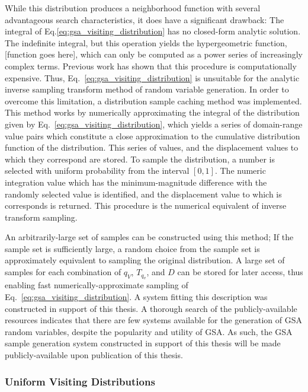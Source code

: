 \documentclass[11pt]{afthesis}
\begin{document}
	While this distribution produces a neighborhood function with several advantageous search characteristics, it does have a significant drawback:  The integral of Eq.\ref{eq:gsa_visiting_distribution} has no closed-form analytic solution. The indefinite integral, but this operation yields the hypergeometric function, [function goes here], which can only be computed as a power series of increasingly complex terms. Previous work \cite{dallinga2004performancegsa} has shown that this procedure is computationally expensive. Thus, Eq.~\ref{eq:gsa_visiting_distribution} is unsuitable for the analytic inverse sampling transform method of random variable generation. In order to overcome this limitation, a distribution sample caching method was implemented. This method works by numerically approximating the integral of the distribution given by Eq.~\ref{eq:gsa_visiting_distribution}, which yields a series of domain-range value pairs which constitute a close approximation to the cumulative distribution function of the distribution. This series of values, and the displacement values to which they correspond are stored. To sample the distribution, a number is selected with uniform probability from the interval $[0,1]$. The numeric integration value which has the minimum-magnitude difference with the randomly selected value is identified, and the displacement value to which is corresponds is returned. This procedure is the numerical equivalent of inverse transform sampling. 
	
	An arbitrarily-large set of samples can be constructed using this method; If the sample set is sufficiently large, a random choice from the sample set is approximately equivalent to sampling the original distribution. A large set of samples for each combination of $q_V$, $T_{q_v}$, and $D$ can be stored for later access, thus enabling fast numerically-approximate sampling of Eq.~\ref{eq:gsa_visiting_distribution}. A system fitting this description was constructed in support of this thesis. A thorough search of the publicly-available resources indicates that there are few systems available for the generation of GSA random variables, despite the popularity and utility of GSA. As such, the GSA sample generation system constructed in support of this thesis will be made publicly-available upon publication of this thesis.
	
	
	\subsubsection{Uniform Visiting Distributions}
	
\end{document}
